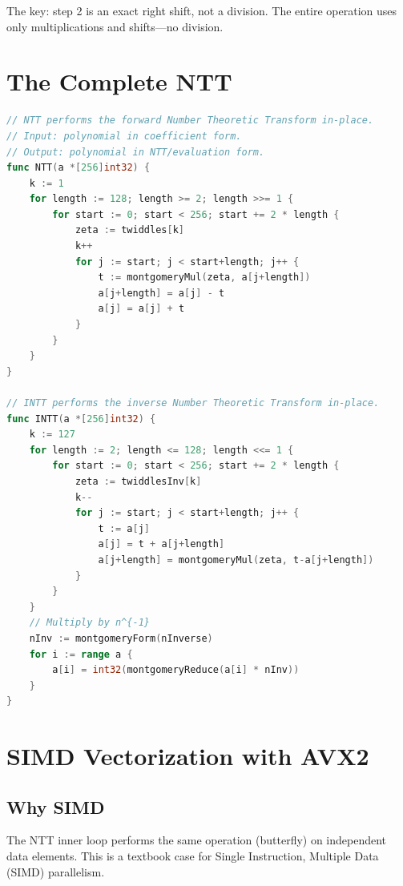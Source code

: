 \documentclass[11pt,a4paper]{article}
\begin{document}
The key: step 2 is an exact right shift, not a division. The entire operation uses
only multiplications and shifts---no division.

\section{The Complete NTT}

\begin{lstlisting}[language=Go,caption={Complete forward NTT in Go}]
// NTT performs the forward Number Theoretic Transform in-place.
// Input: polynomial in coefficient form.
// Output: polynomial in NTT/evaluation form.
func NTT(a *[256]int32) {
    k := 1
    for length := 128; length >= 2; length >>= 1 {
        for start := 0; start < 256; start += 2 * length {
            zeta := twiddles[k]
            k++
            for j := start; j < start+length; j++ {
                t := montgomeryMul(zeta, a[j+length])
                a[j+length] = a[j] - t
                a[j] = a[j] + t
            }
        }
    }
}

// INTT performs the inverse Number Theoretic Transform in-place.
func INTT(a *[256]int32) {
    k := 127
    for length := 2; length <= 128; length <<= 1 {
        for start := 0; start < 256; start += 2 * length {
            zeta := twiddlesInv[k]
            k--
            for j := start; j < start+length; j++ {
                t := a[j]
                a[j] = t + a[j+length]
                a[j+length] = montgomeryMul(zeta, t-a[j+length])
            }
        }
    }
    // Multiply by n^{-1}
    nInv := montgomeryForm(nInverse)
    for i := range a {
        a[i] = int32(montgomeryReduce(a[i] * nInv))
    }
}
\end{lstlisting}

\section{SIMD Vectorization with AVX2}

\subsection{Why SIMD}

The NTT inner loop performs the same operation (butterfly) on independent data elements.
This is a textbook case for Single Instruction, Multiple Data (SIMD) parallelism.
\end{document}
